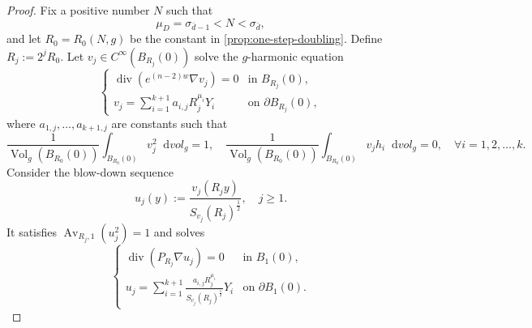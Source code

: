 \documentclass[12pt]{amsart}
\theoremstyle{plain}
\theoremstyle{definition}
\theoremstyle{remark}     %
\numberwithin{equation}{section}
\newcommand{\dd}{\mathop{}\!\mathrm{d}}%
\begin{document}
\begin{proof}
Fix a positive number $N$ such that 
\begin{equation}\label{eq. choice of N in construction}
    \mu_D=\sigma_{\bar{d}-1}<N<\sigma_{\bar{d}},
\end{equation}
and let $R_0=R_0(N,g)$ be the constant in \cref{prop:one-step-doubling}.
Define $R_j:=2^jR_0$.
Let $v_j\in C^{\infty}(B_{R_j}(0))$ solve the $g$-harmonic equation
\[
    \begin{cases}
        \operatorname{div}
        (e^{(n-2)w}\nabla v_j)=0
        &\text{in }B_{R_j}(0),\\
        v_j=\sum_{i=1}^{k+1} a_{i,j} R_j^{\mu_i}Y_i
        &\text{on }\partial B_{R_j}(0),
    \end{cases}
\]
where $a_{1,j},\dots, a_{k+1,j}$ are constants such that
\begin{equation}\label{eq. choice of a ij}
    \frac{1}
    {\operatorname{Vol}_g(B_{R_0}(0))}
    \int_{B_{R_0}(0)}v_j^2\dd vol_g=1,\quad 
    \frac{1}
    {\operatorname{Vol}_g(B_{R_0}(0))}
    \int_{B_{R_0}(0)}v_jh_i\dd vol_g=0,\quad 
    \forall i=1,2,\dots, k.
\end{equation}
Consider the blow-down sequence 
\[
    u_j(y):=\frac{v_j(R_jy)}{S_{v_j}(R_j)^{\frac{1}{2}}},\quad 
    j\geq 1.
\]
It satisfies $\operatorname{Av}_{R_j,1}(u_j^2)=1$ and  solves
\begin{equation}\label{eq. boundary value eq for uj}
    \begin{cases}
        \operatorname{div}
        (P_{R_j}\nabla u_j)=0
        &\text{in }B_{1}(0),\\
        u_j=\sum_{i=1}^{k+1}
        \frac{a_{i,j} R_j^{\mu_i}}{S_{v_j}(R_j)^{\frac{1}{2}}}Y_i
        &\text{on }\partial B_{1}(0).
    \end{cases}
\end{equation}


\end{proof}
\end{document}
